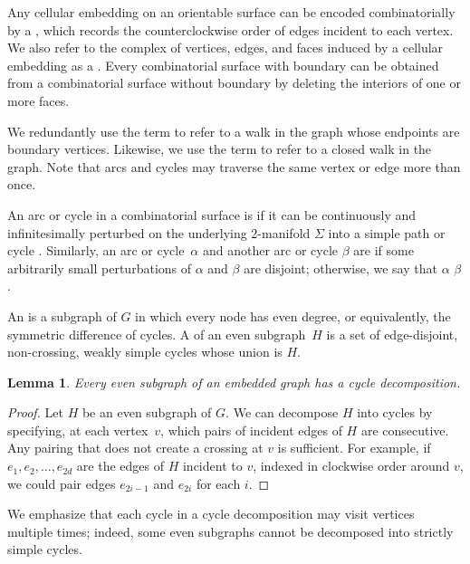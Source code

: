 \documentclass[11pt,twoside]{article}
\newtheorem{lemma}[theorem]{Lemma}
\begin{document}
Any cellular embedding on an orientable surface can be encoded combinatorially by a , which records the counterclockwise order of edges incident to each vertex.
We also refer to the complex of vertices, edges, and faces induced by a cellular embedding as a .
Every combinatorial surface with boundary can be obtained from a combinatorial surface without boundary by deleting the interiors of one or more faces.

We redundantly use the term  to refer to a walk in the graph whose endpoints are boundary vertices.  Likewise, we use the term  to refer to a closed walk in the graph.  Note that arcs and cycles may traverse the same vertex or edge more than once.

An arc or cycle in a combinatorial surface is  if it can be continuously and infinitesimally perturbed on the underlying 2-manifold $\Sigma$ into a simple path or cycle \cite{cex-dwsp-15}.  Similarly, an arc or cycle~$\alpha$ and another arc or cycle $\beta$ are  if some arbitrarily small perturbations of $\alpha$ and $\beta$ are disjoint; otherwise, we say that $\alpha$  $\beta$.

An  is a subgraph of $G$ in which every node has even degree, or equivalently, the symmetric difference of cycles.
A  of an even subgraph~$H$ is a set of edge-disjoint, non-crossing, weakly simple cycles whose union is $H$.

\begin{lemma}
\label{lem:decomposition}
Every even subgraph of an embedded graph has a cycle decomposition.
\end{lemma}

\begin{proof}
Let $H$ be an even subgraph of $G$.  We can decompose $H$ into cycles by specifying, at each vertex~$v$, which pairs of incident edges of $H$ are consecutive.  Any pairing that does not create a crossing at $v$ is sufficient.  For example, if $e_1, e_2, \dots, e_{2d}$ are the edges of $H$ incident to $v$, indexed in clockwise order around $v$, we could pair edges $e_{2i-1}$ and $e_{2i}$ for each $i$.
\end{proof}

We emphasize that each cycle in a cycle decomposition may visit vertices multiple times; indeed, some even subgraphs cannot be decomposed into strictly simple cycles.
\end{document}
